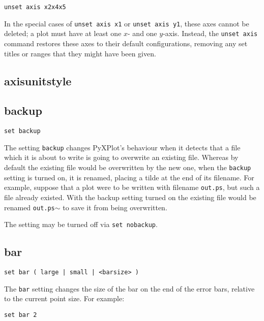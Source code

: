 \begin{verbatim}
unset axis x2x4x5
\end{verbatim}

In the special cases of {\tt unset axis x1} or {\tt unset axis y1}, these axes
cannot be deleted; a plot must have at least one $x$- and one $y$-axis. Instead,
the {\tt unset axis} command restores these axes to their default
configurations, removing any set titles or ranges that they might have been
given.


\subsection{axisunitstyle}


\subsection{backup}

\begin{verbatim}
set backup
\end{verbatim}

The setting {\tt backup} changes PyXPlot's behaviour when it detects that a file
which it is about to write is going to overwrite an existing file. Whereas by
default the existing file would be overwritten by the new one, when the
{\tt backup} setting is turned on, it is renamed, placing a tilde at the end of
its filename. For example, suppose that a plot were to be written with filename
{\tt out.ps}, but such a file already existed.  With the backup setting turned on
the existing file would be renamed {\tt out.ps$\sim$} to save it from being overwritten.

The setting may be turned off via {\tt set nobackup}.


\subsection{bar}

\begin{verbatim}
set bar ( large | small | <barsize> )
\end{verbatim}

The {\tt bar} setting changes the size of the bar on the end of the error bars,
relative to the current point size.  For example:

\begin{verbatim}
set bar 2
\end{verbatim}

